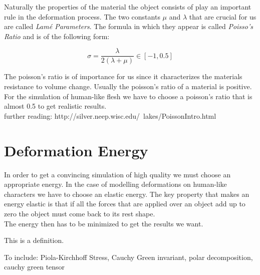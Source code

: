 Naturally the properties of the material the object consists of play an important rule in the deformation process. The two constants $\mu$ and $\lambda$ that are crucial for us are called \textit{Lamé Parameters}. The formula in which they appear is called \textit{Poisso's Ratio} and is of the following form:

\[ \sigma =  \frac{\lambda}{2(\lambda + \mu)} \in [-1, 0.5] \]

The poisson's ratio is of importance for us since it characterizes the materials resistance to volume change. Usually the poisson's ratio of a material is positive.
\\
For the simulation of human-like flesh we have to choose a poisson's ratio that is almost 0.5 to get realistic results.
\\ further reading: http://silver.neep.wisc.edu/~lakes/PoissonIntro.html


\section{Deformation Energy}

In order to get a convincing simulation of high quality we must choose an appropriate energy. In the case of modelling deformations on human-like characters we have to choose an elastic energy. The key property that makes an energy elastic is that if all the forces that are applied over an object add up to zero the object must come back to its rest shape.
\\
The energy then has to be minimized to get the results we want.

\begin{definition}
  This is a definition.
\end{definition}



To include: Piola-Kirchhoff Stress, Cauchy Green invariant, polar decomposition, cauchy green tensor



